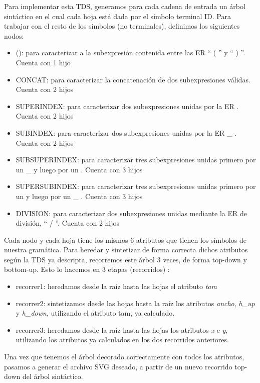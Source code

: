 \documentclass[a4paper, 10pt, twoside]{article}
\begin{document}
Para implementar esta TDS, generamos para cada cadena de entrada un árbol sintáctico en el cual cada hoja está dada por el símbolo terminal ID. Para trabajar con el resto de los símbolos (no terminales), definimos los siguientes nodos:
\begin{itemize} 
  \item (): para caracterizar a la subexpresión contenida entre las ER `` ( '' y `` ) ''. Cuenta con 1 hijo
  \item CONCAT: para caracterizar la concatenación de dos subexpresiones válidas. Cuenta con 2 hijos
  \item SUPERINDEX: para caracterizar dos subexpresiones unidas por la ER \detokenize{^}. Cuenta con 2 hijos
  \item SUBINDEX: para caracterizar dos subexpresiones unidas por la ER \_ . Cuenta con 2 hijos
  \item SUBSUPERINDEX: para caracterizar tres subexpresiones unidas primero por un \_ y luego por un \detokenize{^}. Cuenta con 3 hijos
  \item SUPERSUBINDEX: para caracterizar tres subexpresiones unidas primero por un \detokenize{^} y luego por un \_ . Cuenta con 3 hijos
  \item DIVISION: para caracterizar dos subexpresiones unidas mediante la ER de división, `` / ''. Cuenta con 2 hijos
\end{itemize}

Cada nodo y cada hoja tiene los mismos 6 atributos que tienen los símbolos de nuestra gramática. Para heredar y sintetizar de forma correcta dichos atributos según la TDS ya descripta, recorremos este árbol 3 veces, de forma top-down y bottom-up. Esto lo hacemos en 3 etapas (recorridos) :
\begin{itemize}
  \item recorrer1: heredamos desde la raíz hasta las hojas el atributo \emph{tam} 
  \item recorrer2: sintetizamos desde las hojas hasta la raíz los atributos \emph{ancho}, \emph{h\_up} y \emph{h\_down}, utilizando el atributo tam, ya calculado.
  \item recorrer3: heredamos desde la raíz hasta las hojas los atributos \emph{x} e \emph{y}, utilizando los atributos ya calculados en los dos recorridos anteriores.
\end{itemize}

Una vez que tenemos el árbol decorado correctamente con todos los atributos, pasamos a generar el archivo SVG deseado, a partir de un nuevo recorrido top-down del árbol sintáctico.
\end{document}
